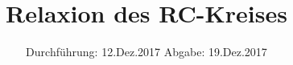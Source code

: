 

\subject{V353}
\title{Relaxion des RC-Kreises}
\date{%
  Durchführung: 12.Dez.2017
  \hspace{3em}
  Abgabe: 19.Dez.2017
}



\maketitle
\thispagestyle{empty}
\tableofcontents
\newpage
%





\printbibliography{}


